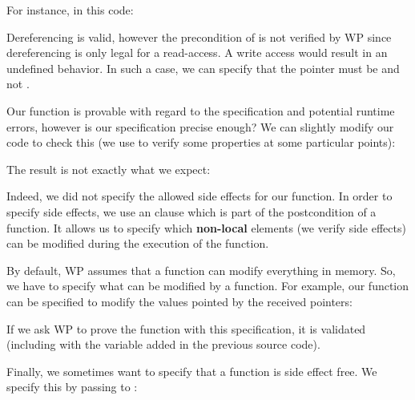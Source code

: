 For instance, in this code:






Dereferencing  is valid, however the precondition of
 is not verified by WP since dereferencing
 is only legal for a read-access. A write access would
result in an undefined behavior. In such a case, we can specify that the
pointer  must be  and not
.





Our  function is provable with regard to the specification
and potential runtime errors, however is our specification precise enough? We
can slightly modify our code to check this (we use  to
verify some properties at some particular points):






The result is not exactly what we expect:





Indeed, we did not specify the allowed side effects for our function. In
order to specify side effects, we use an  clause which is
part of the postcondition of a function. It allows us to specify which
\textbf{non-local} elements (we verify side effects) can be modified
during the execution of the function.



By default, WP assumes that a function can modify everything in
memory. So, we have to specify what can be modified by a function. For
example, our  function can be specified to modify the
values pointed by the received pointers:






If we ask WP to prove the function with this specification, it is
validated (including with the variable added in the previous source
code).



Finally, we sometimes want to specify that a function is side effect
free. We specify this by passing  to
:



